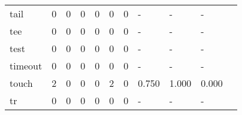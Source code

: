 \begin{longtable}{lp{1.2cm}p{1.2cm}p{1.2cm}p{1.2cm}p{1.2cm}p{1.2cm}p{1.2cm}p{1.2cm}p{1.2cm}p{1.2cm}}
tail      &                                     0 &                                                  0 &                                                  0 &                                                  0 &                                                  0 &                                                  0 &                                             - &                                                  - &                                                  - \\
tee       &                                     0 &                                                  0 &                                                  0 &                                                  0 &                                                  0 &                                                  0 &                                             - &                                                  - &                                                  - \\
test      &                                     0 &                                                  0 &                                                  0 &                                                  0 &                                                  0 &                                                  0 &                                             - &                                                  - &                                                  - \\
timeout   &                                     0 &                                                  0 &                                                  0 &                                                  0 &                                                  0 &                                                  0 &                                             - &                                                  - &                                                  - \\
touch     &                                     2 &                                                  0 &                                                  0 &                                                  0 &                                                  2 &                                                  0 &                                         0.750 &                                              1.000 &                                              0.000 \\
tr        &                                     0 &                                                  0 &                                                  0 &                                                  0 &                                                  0 &                                                  0 &                                             - &                                                  - &                                                  - \\

\end{longtable}
